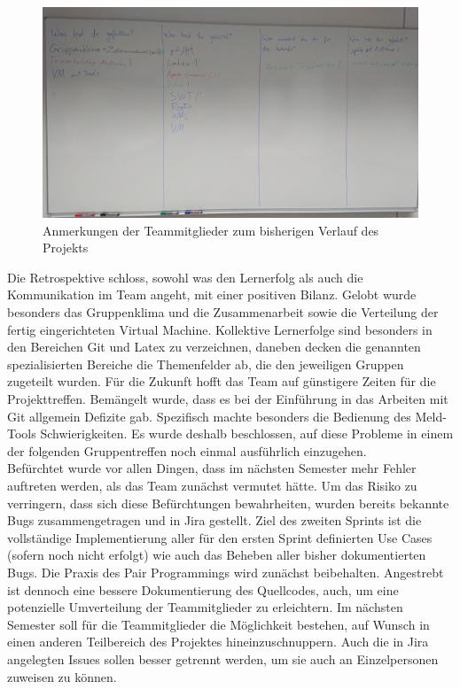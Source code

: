 \begin{figure}[hbtp]
\centering
\includegraphics[scale=0.4]{Bilder/Retrospektive_Tafelbild.jpg} 
\caption{Anmerkungen der Teammitglieder zum bisherigen Verlauf des Projekts}
\end{figure}
Die Retrospektive schloss, sowohl was den Lernerfolg als auch die Kommunikation im Team angeht, mit einer positiven Bilanz. Gelobt wurde besonders das Gruppenklima und die Zusammenarbeit sowie die Verteilung der fertig eingerichteten Virtual Machine. Kollektive Lernerfolge sind besonders in den Bereichen Git und Latex zu verzeichnen, daneben decken die genannten spezialisierten Bereiche die Themenfelder ab, die den jeweiligen Gruppen zugeteilt wurden. Für die Zukunft hofft das Team auf günstigere Zeiten für die Projekttreffen. Bemängelt wurde, dass es bei der Einführung in das Arbeiten mit Git allgemein Defizite gab. Spezifisch machte besonders die Bedienung des Meld-Tools Schwierigkeiten. Es wurde deshalb beschlossen, auf diese Probleme in einem der folgenden Gruppentreffen noch einmal ausführlich einzugehen.\\
Befürchtet wurde vor allen Dingen, dass im nächsten Semester mehr Fehler auftreten werden, als das Team zunächst vermutet hätte. Um das Risiko zu verringern, dass sich diese Befürchtungen bewahrheiten, wurden bereits bekannte Bugs zusammengetragen und in Jira gestellt. Ziel des zweiten Sprints ist die vollständige Implementierung aller für den ersten Sprint definierten Use Cases (sofern noch nicht erfolgt) wie auch das Beheben aller bisher dokumentierten Bugs. Die Praxis des Pair Programmings wird zunächst beibehalten. Angestrebt ist dennoch eine bessere Dokumentierung des Quellcodes, auch, um eine potenzielle Umverteilung der Teammitglieder zu erleichtern. Im nächsten Semester soll für die Teammitglieder die Möglichkeit bestehen, auf Wunsch in einen anderen Teilbereich des Projektes \glqq hineinzuschnuppern\grqq. Auch die in Jira angelegten Issues sollen besser getrennt werden, um sie auch an Einzelpersonen zuweisen zu können.\\ \\
\nsecend

